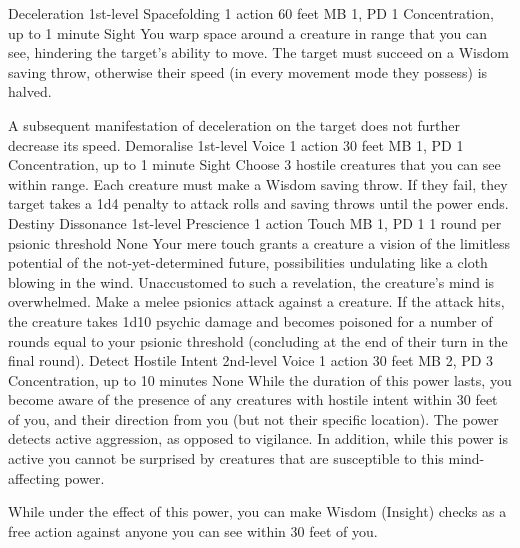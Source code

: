 \DndPowerHeader%
    {Deceleration\label{pwr:deceleration}}
    {1st-level Spacefolding}
    {1 action}
    {60 feet}
    {MB 1, PD 1}
    {Concentration, up to 1 minute}
    {Sight}
You warp space around a creature in range
that you can see, hindering the target's ability to move.
The target must succeed on a Wisdom saving throw, otherwise
their speed (in every movement mode they possess) is halved.

A subsequent manifestation of deceleration on the target does
not further decrease its speed.
\DndPowerHeader%
    {Demoralise\label{pwr:demoralise}}
    {1st-level Voice}
    {1 action}
    {30 feet}
    {MB 1, PD 1}
    {Concentration, up to 1 minute}
    {Sight}
Choose 3 hostile creatures that you can see
within range. Each creature must make a Wisdom saving throw.
If they fail, they target takes a 1d4 penalty to attack rolls
and saving throws until the power ends.
\DndPowerHeader%
    {Destiny Dissonance\label{pwr:destiny-dissonance}}
    {1st-level Prescience}
    {1 action}
    {Touch}
    {MB 1, PD 1}
    {1 round per psionic threshold}
    {None}
Your mere touch grants a creature a vision
of the limitless potential of the not-yet-determined future,
possibilities undulating like a cloth blowing in the wind.
Unaccustomed to such a revelation, the creature's mind is
overwhelmed. Make a melee psionics attack against a creature.
If the attack hits, the creature takes 1d10 psychic damage
and becomes poisoned for a number of rounds equal to your
psionic threshold (concluding at the end of their turn
in the final round).
\DndPowerHeader%
    {Detect Hostile Intent\label{pwr:detect-hostile-intent}}
    {2nd-level Voice}
    {1 action}
    {30 feet}
    {MB 2, PD 3}
    {Concentration, up to 10 minutes}
    {None}
While the duration of this power lasts, you
become aware of the presence of any creatures with hostile
intent within 30 feet of you, and their direction from you
(but not their specific location). The power detects active
aggression, as opposed to vigilance. In addition, while this
power is active you cannot be surprised by creatures that
are susceptible to this mind-affecting power.

While under the effect of this power, you can make Wisdom
(Insight) checks as a free action against anyone you can see
within 30 feet of you.

